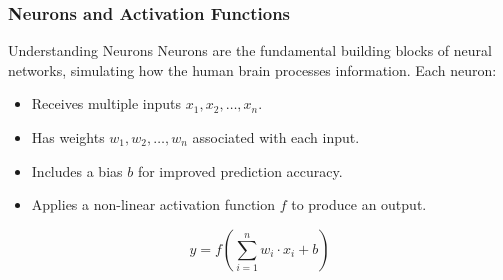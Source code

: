 \documentclass[aspectratio=169]{beamer}
\begin{document}
\begin{frame}[fragile]
  \frametitle{Neurons and Activation Functions}

  \begin{block}{Understanding Neurons}
    Neurons are the fundamental building blocks of neural networks, simulating how the human brain processes information. Each neuron:
    \begin{itemize}
      \item Receives multiple inputs $x_1, x_2, \ldots, x_n$.
      \item Has weights $w_1, w_2, \ldots, w_n$ associated with each input.
      \item Includes a bias $b$ for improved prediction accuracy.
      \item Applies a non-linear activation function $f$ to produce an output.
    \end{itemize}

    \begin{equation}
      y = f\left(\sum_{i=1}^{n} w_i \cdot x_i + b\right) 
    \end{equation}
  \end{block}
\end{frame}
\end{document}
